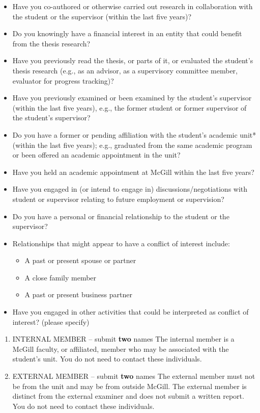 \documentclass[
  letterpaper,
  DIV=11,
  numbers=noendperiod]{scrreprt}
\providecommand{\tightlist}{%
  \setlength{\itemsep}{0pt}\setlength{\parskip}{0pt}}
\begin{document}
\begin{itemize}
\tightlist
\item
  Have you co-authored or otherwise carried out research in
  collaboration with the student or the supervisor (within the last five
  years)?
\item
  Do you knowingly have a financial interest in an entity that could
  benefit from the thesis research?
\item
  Have you previously read the thesis, or parts of it, or evaluated the
  student's thesis research (e.g., as an advisor, as a supervisory
  committee member, evaluator for progress tracking)?
\item
  Have you previously examined or been examined by the student's
  supervisor (within the last five years), e.g., the former student or
  former supervisor of the student's supervisor?
\item
  Do you have a former or pending affiliation with the student's
  academic unit* (within the last five years); e.g., graduated from the
  same academic program or been offered an academic appointment in the
  unit?
\item
  Have you held an academic appointment at McGill within the last five
  years?
\item
  Have you engaged in (or intend to engage in) discussions/negotiations
  with student or supervisor relating to future employment or
  supervision?
\item
  Do you have a personal or financial relationship to the student or the
  supervisor?
\item
  Relationships that might appear to have a conflict of interest
  include:

  \begin{itemize}
  \tightlist
  \item
    A past or present spouse or partner
  \item
    A close family member
  \item
    A past or present business partner
  \end{itemize}
\item
  Have you engaged in other activities that could be interpreted as
  conflict of interest? (please specify)
\end{itemize}

\begin{enumerate}
\def\labelenumi{\arabic{enumi}.}
\setcounter{enumi}{2}
\item
  INTERNAL MEMBER -- submit \textbf{two} names The internal member is a
  McGill faculty, or affiliated, member who may be associated with the
  student's unit. You do not need to contact these individuals.
\item
  EXTERNAL MEMBER -- submit \textbf{two} names The external member must
  not be from the unit and may be from outside McGill. The external
  member is distinct from the external examiner and does not submit a
  written report. You do not need to contact these individuals.
\end{enumerate}
\end{document}

